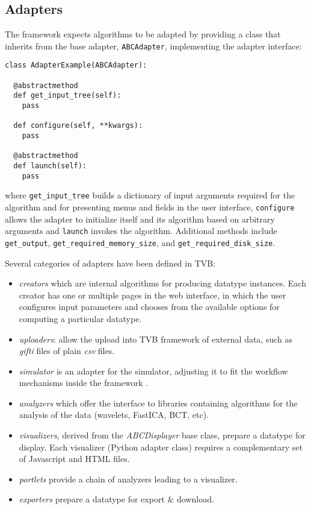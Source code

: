 \subsection{Adapters}

The framework expects algorithms to be adapted by providing a class
that inherits from the base adapter, \texttt{ABCAdapter}, implementing 
the adapter interface:

\begin{lstlisting}[caption={Excerpt of the ABCAdapter},
                   label={lst:ABCAdapter}]
class AdapterExample(ABCAdapter):

  @abstractmethod
  def get_input_tree(self):
  	pass

  def configure(self, **kwargs):
  	pass

  @abstractmethod
  def launch(self):
  	pass
\end{lstlisting}

\noindent where \texttt{get\_input\_tree} builds a dictionary of input
arguments required for the algorithm and for
presenting menus and fields in the user interface, \texttt{configure} allows the 
adapter to initialize itself and its algorithm based on arbitrary arguments
and \texttt{launch} invokes the algorithm.
Additional methods include \texttt{get\_output}, \texttt{get\_required\_memory\_size},
and
\texttt{get\_required\_disk\_size}.

Several categories of adapters have been defined in TVB: 

\begin{itemize}
	\item \textit{creators} which are internal algorithms for producing datatype instances. 
		Each creator has one or multiple pages in the web interface, in which the user
		 configures input parameters and chooses from the available options for computing a particular datatype.

	\item \textit{uploaders}: allow the upload into TVB framework of external data, 
    		such as \emph{gifti} files of plain \emph{csv} files.

	\item \textit{simulator} is an adapter for the simulator, adjusting it to fit
		the workflow mechanisms inside the framework .

	\item \textit{analyzers} which offer the interface to libraries containing algorithms 
		for the analysis of the data (wavelets, FastICA, BCT, etc).

	\item \textit{visualizers}, derived from the \emph{ABCDisplayer} base class, prepare a datatype
		for display. Each visualizer (Python adapter class) requires a complementary set
		of Javascript and HTML files. 

	\item \textit{portlets} provide a chain of analyzers leading to a visualizer.

	\item \textit{exporters} prepare a datatype for export \& download.

\end{itemize}

